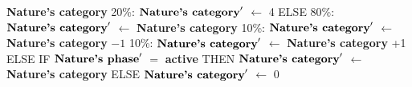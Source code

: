 \documentclass{article}%
\begin{document}
\begin{flushleft}
\textbf{Nature's category}%
\linebreak%
\hspace*{10em}%
20\%: %
$\mbox{\textbf{Nature's category}} '$%
$\leftarrow$%
4%
\linebreak%
\hspace*{8em}%
ELSE %
\linebreak%
\hspace*{10em}%
80\%: %
$\mbox{\textbf{Nature's category}} '$%
$\leftarrow$%
\textbf{Nature's category}%
\linebreak%
\hspace*{10em}%
10\%: %
$\mbox{\textbf{Nature's category}} '$%
$\leftarrow$%
\textbf{Nature's category}%
${-}1$%
\linebreak%
\hspace*{10em}%
10\%: %
$\mbox{\textbf{Nature's category}} '$%
$\leftarrow$%
\textbf{Nature's category}%
+1%
\linebreak%
\hspace*{2em}%
ELSE %
IF %
$\mbox{\textbf{Nature's phase}} '$%
$=$%
\textbf{active}%
\linebreak%
\hspace*{4em}%
THEN %
$\mbox{\textbf{Nature's category}} '$%
$\leftarrow$%
\textbf{Nature's category}%
\linebreak%
\hspace*{4em}%
ELSE %
$\mbox{\textbf{Nature's category}} '$%
$\leftarrow$%
0%
\end{flushleft}

%
\end{document}
